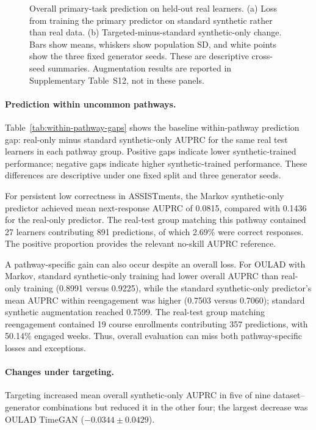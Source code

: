 \documentclass[fleqn,10pt]{JLA_article}
\begin{document}
\begin{figure}[!htbp]
\centering
\resizebox{\linewidth}{!}{}
\caption{Overall primary-task prediction on held-out real learners. (a) Loss from training the primary predictor on standard synthetic rather than real data. (b) Targeted-minus-standard synthetic-only change. Bars show means, whiskers show population SD, and white points show the three fixed generator seeds. These are descriptive cross-seed summaries. Augmentation results are reported in Supplementary Table~S12, not in these panels.}
\label{fig:rq2-utility-targeting}
\end{figure}

\paragraph{Prediction within uncommon pathways.}
Table~\ref{tab:within-pathway-gaps} shows the baseline within-pathway prediction gap: real-only minus standard synthetic-only AUPRC for the same real test learners in each pathway group. Positive gaps indicate lower synthetic-trained performance; negative gaps indicate higher synthetic-trained performance. These differences are descriptive under one fixed split and three generator seeds.



For persistent low correctness in ASSISTments, the Markov synthetic-only predictor achieved mean next-response AUPRC of 0.0815, compared with 0.1436 for the real-only predictor. The real-test group matching this pathway contained 27 learners contributing 891 predictions, of which 2.69\% were correct responses. The positive proportion provides the relevant no-skill AUPRC reference.

A pathway-specific gain can also occur despite an overall loss. For OULAD with Markov, standard synthetic-only training had lower overall AUPRC than real-only training (0.8991 versus 0.9225), while the standard synthetic-only predictor's mean AUPRC within reengagement was higher (0.7503 versus 0.7060); standard synthetic augmentation reached 0.7599. The real-test group matching reengagement contained 19 course enrollments contributing 357 predictions, with 50.14\% engaged weeks. Thus, overall evaluation can miss both pathway-specific losses and exceptions.

\paragraph{Changes under targeting.}
Targeting increased mean overall synthetic-only AUPRC in five of nine dataset--generator combinations but reduced it in the other four; the largest decrease was OULAD TimeGAN (\(-0.0344\pm0.0429\)).
\end{document}
